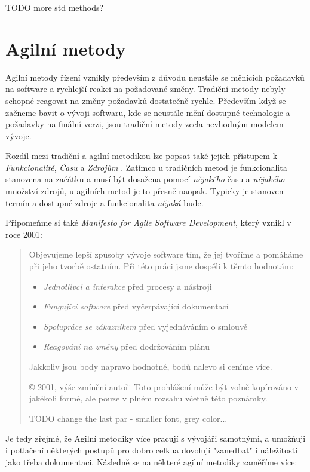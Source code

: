 TODO more std methods?

\section{Agilní metody} \label{methods:agile}

Agilní metody řízení vznikly především z důvodu neustále se měnících požadavků na software a rychlejší reakci na požadované změny. Tradiční metody nebyly schopné reagovat na změny požadavků dostatečně rychle. Především když se začneme bavit o vývoji softwaru, kde se neustále mění dostupné technologie a požadavky na finální verzi, jsou tradiční metody zcela nevhodným modelem vývoje.

Rozdíl mezi tradiční a agilní metodikou lze popsat také jejich přístupem k \emph{Funkcionalitě}, \emph{Času} a \emph{Zdrojům} \cite{kadlec}. Zatímco u tradičních metod je funkcionalita stanovena na začátku a musí být dosažena pomocí \emph{nějakého} času a \emph{nějakého} množství zdrojů, u agilních metod je to přesně naopak. Typicky je stanoven termín a dostupné zdroje a funkcionalita \emph{nějaká} bude.

Připomeňme si také \emph{Manifesto for Agile Software Development}\cite{manifesto}, který vznikl v roce 2001:

\begin{quote}
Objevujeme lepší způsoby vývoje software tím,
že jej tvoříme a pomáháme při jeho tvorbě ostatním.
Při této práci jsme dospěli k těmto hodnotám:
\begin{itemize}
	\item \emph{Jednotlivci a interakce} před procesy a nástroji
	\item \emph{Fungující software} před vyčerpávající dokumentací
	\item \emph{Spolupráce se zákazníkem} před vyjednáváním o smlouvě
	\item \emph{Reagování na změny} před dodržováním plánu
\end{itemize}
Jakkoliv jsou body napravo hodnotné,
bodů nalevo si ceníme více.

© 2001, výše zmínění autoři
Toto prohlášení může být volně kopírováno v jakékoli formě,
ale pouze v plném rozsahu včetně této poznámky. 

TODO change the last par - smaller font, grey color...

\end{quote}

Je tedy zřejmé, že Agilní metodiky více pracují s vývojáři samotnými, a umožňuji i potlačení některých postupů pro dobro celkua dovolují "zanedbat" i náležitosti jako třeba dokumentaci. Následně se na některé agilní metodiky zaměříme více:

